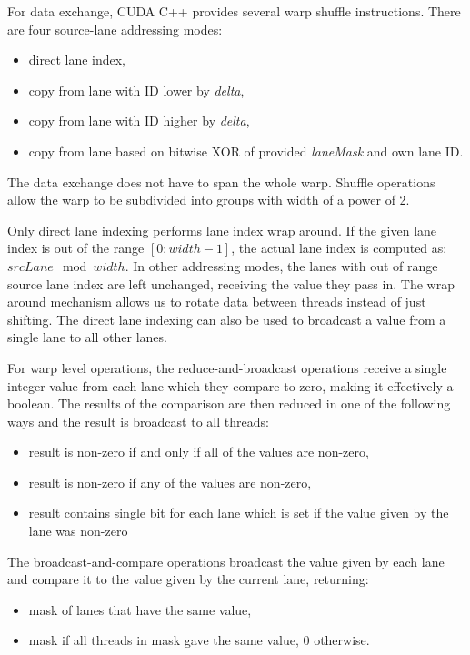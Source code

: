 For data exchange, CUDA C++ provides several warp shuffle instructions. There are four source-lane addressing modes:
\begin{itemize}
	\item direct lane index,
	\item copy from lane with ID lower by \textit{delta},
	\item copy from lane with ID higher by \textit{delta},
	\item copy from lane based on bitwise XOR of provided \textit{laneMask} and own lane ID. 
\end{itemize}

The data exchange does not have to span the whole warp. Shuffle operations allow the warp to be subdivided into groups with width of a power of 2.

Only direct lane indexing performs lane index wrap around. If the given lane index is out of the range $[0:width - 1]$, the actual lane index is computed as: $srcLane \mod width$. In other addressing modes, the lanes with out of range source lane index are left unchanged, receiving the value they pass in. The wrap around mechanism allows us to rotate data between threads instead of just shifting. The direct lane indexing can also be used to broadcast a value from a single lane to all other lanes. %

For warp level operations, the reduce-and-broadcast operations receive a single integer value from each lane which they compare to zero, making it effectively a boolean. The results of the comparison are then reduced in one of the following ways and the result is broadcast to all threads:
\begin{itemize}
	\item result is non-zero if and only if all of the values are non-zero,
	\item result is non-zero if any of the values are non-zero,
	\item result contains single bit for each lane which is set if the value given by the lane was non-zero
\end{itemize}

The broadcast-and-compare operations broadcast the value given by each lane and compare it to the value given by the current lane, returning:
\begin{itemize}
	\item mask of lanes that have the same value,
	\item mask if all threads in mask gave the same value, 0 otherwise.
\end{itemize}

